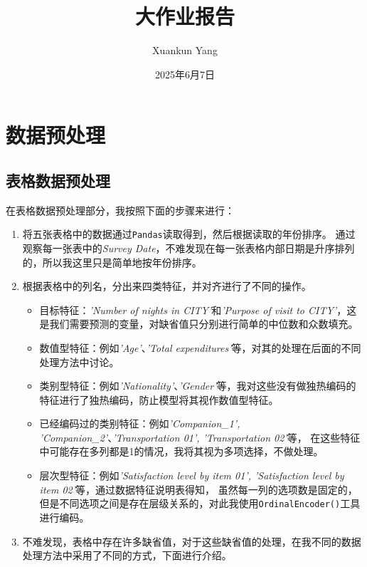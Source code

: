 \documentclass[12pt, a4paper, oneside]{ctexart}
\title{\textbf{大作业报告}}
\author{Xuankun Yang}
\date{2025年6月7日}
\begin{document}
\maketitle
\tableofcontents

\section{数据预处理}

\subsection{表格数据预处理}
在表格数据预处理部分，我按照下面的步骤来进行：
\begin{enumerate}
    \item 将五张表格中的数据通过\texttt{Pandas}读取得到，然后根据读取的年份排序。
    通过观察每一张表中的\emph{Survey Date}，不难发现在每一张表格内部日期是升序排列的，所以我这里只是简单地按年份排序。
    \item 
    {
        根据表格中的列名，分出来四类特征，并对齐进行了不同的操作。
        \begin{itemize}
            \item 目标特征：\emph{'Number of nights in CITY'}和\emph{'Purpose of visit to CITY'}，这是我们需要预测的变量，对缺省值只分别进行简单的中位数和众数填充。
            \item 数值型特征：例如\emph{'Age'}、\emph{'Total expenditures'}等，对其的处理在后面的不同处理方法中讨论。
            \item 类别型特征：例如\emph{'Nationality'}、\emph{'Gender'}等，我对这些没有做独热编码的特征进行了独热编码，防止模型将其视作数值型特征。
            \item 已经编码过的类别特征：例如\emph{'Companion\_1', 'Companion\_2'}、\emph{'Transportation 01', 'Transportation 02'}等，
            在这些特征中可能存在多列都是1的情况，我将其视为多项选择，不做处理。
            \item 层次型特征：例如\emph{'Satisfaction level by item 01', 'Satisfaction level by item 02'}等，通过数据特征说明表得知，
            虽然每一列的选项数是固定的，但是不同选项之间是存在层级关系的，对此我使用\texttt{OrdinalEncoder()}工具进行编码。
        \end{itemize}
    }
    \item 不难发现，表格中存在许多缺省值，对于这些缺省值的处理，在我不同的数据处理方法中采用了不同的方式，下面进行介绍。
    
\end{enumerate}
\end{document}
